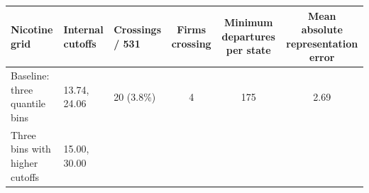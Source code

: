 \documentclass[10pt,]{article}
\begin{document}
\begin{longtable}[]{@{}lllccc@{}}
\toprule
\begin{minipage}[b]{0.10\columnwidth}\raggedright\strut
Nicotine grid\strut
\end{minipage} & \begin{minipage}[b]{0.12\columnwidth}\raggedright\strut
Internal cutoffs\strut
\end{minipage} & \begin{minipage}[b]{0.10\columnwidth}\raggedright\strut
Crossings / 531\strut
\end{minipage} & \begin{minipage}[b]{0.10\columnwidth}\centering\strut
Firms crossing\strut
\end{minipage} & \begin{minipage}[b]{0.19\columnwidth}\centering\strut
Minimum departures per state\strut
\end{minipage} & \begin{minipage}[b]{0.22\columnwidth}\centering\strut
Mean absolute representation error\strut
\end{minipage}\tabularnewline
\midrule
\endhead
\begin{minipage}[t]{0.10\columnwidth}\raggedright\strut
Baseline: three quantile bins\strut
\end{minipage} & \begin{minipage}[t]{0.12\columnwidth}\raggedright\strut
13.74, 24.06\strut
\end{minipage} & \begin{minipage}[t]{0.10\columnwidth}\raggedright\strut
20 (3.8\%)\strut
\end{minipage} & \begin{minipage}[t]{0.10\columnwidth}\centering\strut
4\strut
\end{minipage} & \begin{minipage}[t]{0.19\columnwidth}\centering\strut
175\strut
\end{minipage} & \begin{minipage}[t]{0.22\columnwidth}\centering\strut
2.69\strut
\end{minipage}\tabularnewline
\begin{minipage}[t]{0.10\columnwidth}\raggedright\strut
Three bins with higher cutoffs\strut
\end{minipage} & \begin{minipage}[t]{0.12\columnwidth}\raggedright\strut
15.00, 30.00\strut
\end{minipage} & \begin{minipage}[t]{0.10\columnwidth}\raggedright\strut

\end{minipage}
\end{longtable}
\end{document}
